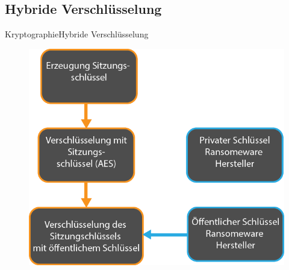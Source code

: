 \documentclass[10pt]{beamer}
\begin{document}
\subsection{Hybride Verschlüsselung}
\begin{frame}{Kryptographie}{Hybride Verschlüsselung}
	\begin{figure}[]
		\centering
		\includegraphics[width=.6\linewidth]{hybride_Verschluesselubg.png}
	\end{figure}
\end{frame}
\end{document}
